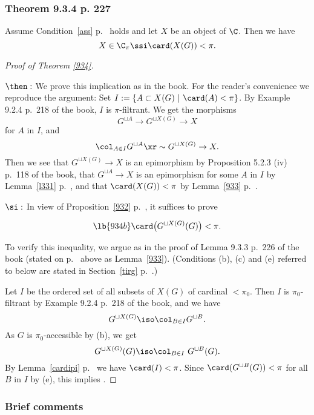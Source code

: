 \documentclass[12pt]{article}
\theoremstyle{remark}
\theoremstyle{definition}
\begin{document}
\subsubsection{Theorem 9.3.4 p. 227}

\begin{thm}[Theorem 9.3.4 p.~227]
Assume Condition~\ref{ass} p.~ holds and let $X$ be an object of $\C$. Then we have 
$$
X\in\C_\pi\ssi\card(X(G))<\pi.
$$ 
\end{thm}

\begin{proof}[Proof of Theorem \ref{934}]\

\nn$\then:$ We prove this implication as in the book. For the reader's convenience we reproduce the argument: Set $I:=\{A\subset X(G)\ |\ \card(A)<\pi\}$. By Example 9.2.4 p.~218 of the book, $I$ is $\pi$-filtrant. We get the morphisms 
$$
G^{\sqcup A}\to G^{\sqcup X(G)}\to X
$$ 
for $A$ in $I$, and 
$$
\col_{A\in I}G^{\sqcup A}\xr\sim G^{\sqcup X(G)}\to X.
$$ 
Then we see that $G^{\sqcup X(G)}\to X$ is an epimorphism by Proposition 5.2.3 (iv) p.~118 of the book, that $G^{\sqcup A}\to X$ is an epimorphism for some $A$ in $I$ by Lemma~\ref{l331} p.~, and that $\card(X(G))<\pi$ by Lemma~\ref{933} p.~.

\nn$\si:$ In view of Proposition~\ref{932} p.~, it suffices to prove  

\begin{equation}\lb{934b}
\card\big(G^{\sqcup X(G)}(G)\big)<\pi.
\end{equation} 

To verify this inequality, we argue as in the proof of Lemma 9.3.3 p.~226 of the book (stated on p.~ above as Lemma~\ref{933}). (Conditions (b), (c) and (e) referred to below are stated in Section~\ref{tirg} p.~.)

Let $I$ be the ordered set of all subsets of $X(G)$ of cardinal $<\pi_0$. Then $I$ is $\pi_0$-filtrant by Example 9.2.4 p.~218 of the book, and we have 
$$
G^{\sqcup X(G)}\iso\col_{B\in I}G^{\sqcup B}.
$$ 
As $G$ is $\pi_0$-accessible by (b), we get 
$$
G^{\sqcup X(G)}(G)\iso\col_{B\in I}\ G^{\sqcup B}(G).
$$ 
By Lemma~\ref{cardipi} p.~ we have $\card(I)<\pi$. Since $\card(G^{\sqcup B}(G))<\pi$ for all $B$ in $I$ by (e), this implies .
\end{proof}

\subsubsection{Brief comments}
\end{document}
